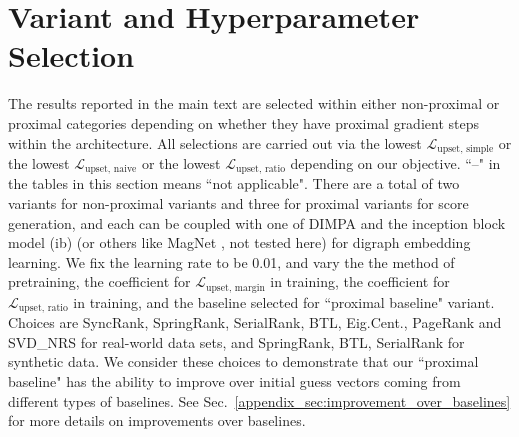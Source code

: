 \documentclass[nohyperref]{article}
\theoremstyle{plain}
\theoremstyle{definition}
\theoremstyle{remark}
\begin{document}
\section{Variant and Hyperparameter Selection}
\label{appendix_sec:variant_hyper}
The results reported in the main text are selected within either non-proximal or proximal categories depending on whether they have proximal gradient steps within the architecture. All selections are carried out via the lowest $\mathcal{L}_\text{upset, simple}$ or the lowest $\mathcal{L}_\text{upset, naive}$ or the lowest $\mathcal{L}_\text{upset, ratio}$ depending on our objective. ``--" in the tables in this section means ``not applicable". There are a total of two variants for non-proximal variants and three for proximal variants for score generation, and each can be coupled with one of DIMPA \cite{he2021digrac} and the inception block model (ib) \cite{tong2020digraph} (or others like MagNet \cite{zhang2021magnet}, not tested here) for digraph embedding learning. We fix the learning rate to be 0.01, and vary the the method of pretraining, the coefficient for $\mathcal{L}_\text{upset, margin}$ in training, the coefficient for $\mathcal{L}_\text{upset, ratio}$ in training, %
and the baseline selected for ``proximal baseline" variant. Choices are SyncRank, SpringRank, SerialRank,  BTL, Eig.Cent., PageRank and SVD\_NRS for real-world data sets, and SpringRank, BTL, SerialRank for synthetic data. We consider  these choices to demonstrate that our ``proximal baseline" has the ability to improve over initial guess vectors coming from different types of baselines. See  Sec.~\ref{appendix_sec:improvement_over_baselines} for more details on improvements over baselines. 
\end{document}

